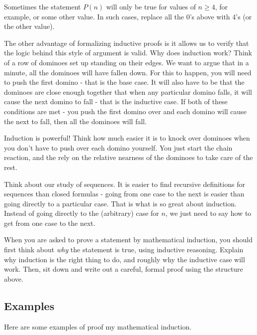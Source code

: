 \documentclass[12pt]{article}
\begin{document}
Sometimes the statement $P(n)$ will only be true for values of $n \ge 4$, for example, or some other value.  In such cases, replace all the 0's above with 4's (or the other value).

The other advantage of formalizing inductive proofs is it allows us to verify that the logic behind this style of argument is valid.  Why does induction work?  Think of a row of dominoes set up standing on their edges.  We want to argue that in a minute, all the dominoes will have fallen down.  For this to happen, you will need to push the first domino - that is the base case.  It will also have to be that the dominoes are close enough together that when any particular domino falls, it will cause the next domino to fall - that is the inductive case.  If both of these conditions are met - you push the first domino over and each domino will cause the next to fall, then all the dominoes will fall.

Induction is powerful!  Think how much easier it is to knock over dominoes when you don't have to push over each domino yourself.  You just start the chain reaction, and the rely on the relative nearness of the dominoes to take care of the rest.  

Think about our study of sequences.  It is easier to find recursive definitions for sequences than closed formulas - going from one case to the next is easier than going directly to a particular case.  That is what is so great about induction.  Instead of going directly to the (arbitrary) case for $n$, we just need to say how to get from one case to the next.  

When you are asked to prove a statement by mathematical induction, you should first think about {\em why} the statement is true, using inductive reasoning.  Explain why induction is the right thing to do, and roughly why the inductive case will work.  Then, sit down and write out a careful, formal proof using the structure above.

\subsection{Examples}

Here are some examples of proof my mathematical induction.
\end{document}
